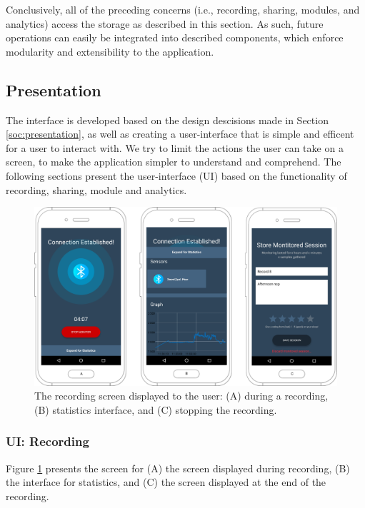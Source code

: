 Conclusively, all of the preceding concerns (i.e., recording, sharing, modules, and analytics) access the storage as described in this section. As such, future operations can easily be integrated into described components, which enforce modularity and extensibility to the application.

\subsection{Presentation}\label{ioc:presentation}
The interface is developed based on the design descisions made in Section \ref{soc:presentation}, as well as creating a user-interface that is simple and efficent for a user to interact with. We try to limit the actions the user can take on a screen, to make the application simpler to understand and comprehend. The following sections present the user-interface (UI) based on the functionality of recording, sharing, module and analytics. 

\begin{figure}[!h]
    \centering
    \includegraphics[scale=0.26]{images/Recording_img.pdf}
    \caption{The recording screen displayed to the user: (A) during a recording, (B) statistics interface, and (C) stopping the recording.}
    \label{fig:screen_recording}
\end{figure}

\subsubsection{UI: Recording}

Figure \ref{fig:screen_recording} presents the screen for (A) the screen displayed during recording, (B) the interface for statistics, and (C) the screen displayed at the end of the recording. 

